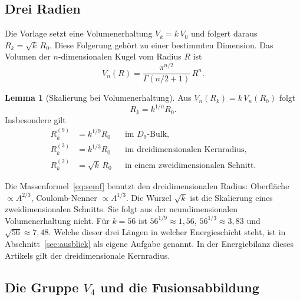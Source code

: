 \documentclass[11pt,a4paper]{article}
\theoremstyle{definition}
\newtheorem{lemma}[satz]{Lemma}
\theoremstyle{remark}
\newcommand{\Dn}{D_9}
\newcommand{\Vf}{V_4}
\begin{document}
\subsection{Drei Radien}
\label{sec:radien}

Die Vorlage setzt eine Volumenerhaltung \(V_k=k\,V_0\) und folgert daraus \(R_k=\sqrt{k}\,R_0\). Diese Folgerung gehört zu einer bestimmten Dimension. Das Volumen der \(n\)-dimensionalen Kugel vom Radius \(R\) ist
\begin{equation}
V_n(R)=\frac{\pi^{n/2}}{\Gamma(n/2+1)}\,R^n.
\end{equation}

\begin{lemma}[Skalierung bei Volumenerhaltung]
\label{lem:radius}
Aus \(V_n(R_k)=k\,V_n(R_0)\) folgt
\begin{equation}
R_k=k^{1/n}R_0.
\end{equation}
Insbesondere gilt
\begin{align}
R_k^{(9)}&=k^{1/9}R_0 && \text{im \(\Dn\)-Bulk},\\
R_k^{(3)}&=k^{1/3}R_0 && \text{im dreidimensionalen Kernradius},\\
R_k^{(2)}&=\sqrt{k}\,R_0 && \text{in einem zweidimensionalen Schnitt}.
\end{align}
\end{lemma}

Die Massenformel~\eqref{eq:semf} benutzt den dreidimensionalen Radius: Oberfläche \(\propto A^{2/3}\), Coulomb-Nenner \(\propto A^{1/3}\). Die Wurzel \(\sqrt{k}\) ist die Skalierung eines zweidimensionalen Schnitts. Sie folgt aus der neundimensionalen Volumenerhaltung nicht. Für \(k=56\) ist \(56^{1/9}\approx 1{,}56\), \(56^{1/3}\approx 3{,}83\) und \(\sqrt{56}\approx 7{,}48\). Welche dieser drei Längen in welcher Energieschicht steht, ist in Abschnitt~\ref{sec:ausblick} als eigene Aufgabe genannt. In der Energiebilanz dieses Artikels gilt der dreidimensionale Kernradius.

\subsection{Die Gruppe \texorpdfstring{\(\Vf\)}{V4} und die Fusionsabbildung}
\end{document}
